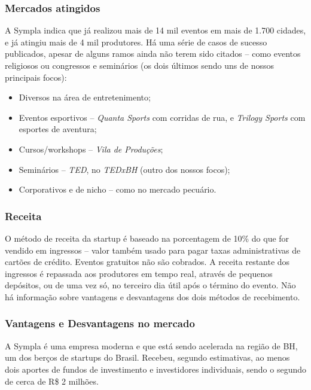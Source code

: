 \documentclass[a4paper]{abntex2}
\begin{document}
\subsubsection*{Mercados atingidos}
A Sympla indica que já realizou mais de 14 mil eventos em mais de 1.700 cidades, e já atingiu mais de 4 mil produtores. Há uma série de casos de sucesso publicados\cite{sympla-cases}, apesar de alguns ramos ainda não terem sido citados -- como eventos religiosos ou congressos e seminários (os dois últimos sendo uns de nossos principais focos):
\begin{itemize}[itemsep=-1ex]
	\item Diversos na área de entretenimento;
	\item Eventos esportivos -- \emph{Quanta Sports} com corridas de rua, e \emph{Trilogy Sports} com esportes de aventura;
	\item Cursos/workshops -- \emph{Vila de Produções};
	\item Seminários -- \emph{TED}\footnotemark, no \emph{TEDxBH} (outro dos nossos focos);
	\item Corporativos e de nicho -- como no mercado pecuário.
\end{itemize}

\subsubsection*{Receita}
O método de receita da startup é baseado na porcentagem de 10\% do que for vendido em ingressos -- valor também usado para pagar taxas administrativas de cartões de crédito. Eventos gratuitos não são cobrados. A receita restante dos ingressos é repassada aos produtores em tempo real, através de pequenos depósitos, ou de uma vez só, no terceiro dia útil após o término do evento. Não há informação sobre vantagens e desvantagens dos dois métodos de recebimento.

\subsubsection*{Vantagens e Desvantagens no mercado}
A Sympla é uma empresa moderna e que está sendo acelerada na região de BH, um dos berços de startups do Brasil. Recebeu, segundo estimativas, ao menos dois aportes de fundos de investimento e investidores individuais, sendo o segundo de cerca de R\$ 2 milhões.\cite{sympla-aporte}
\end{document}
